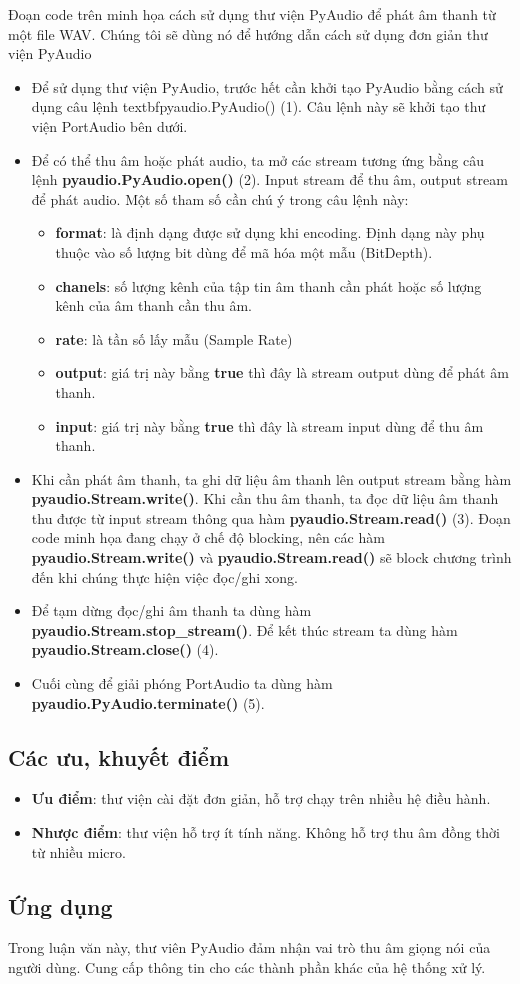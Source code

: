 Đoạn code trên minh họa cách sử dụng thư viện PyAudio để phát âm thanh từ một file WAV. Chúng tôi sẽ dùng nó để hướng dẫn cách sử dụng đơn giản thư viện PyAudio
\begin{itemize}
	\item Để sử dụng thư viện PyAudio, trước hết cần khởi tạo PyAudio bằng cách sử dụng câu lệnh textbf{pyaudio.PyAudio()} (1). Câu  lệnh này sẽ khởi tạo thư viện PortAudio bên dưới.
	\item Để có thể thu âm hoặc phát audio, ta mở các stream tương ứng bằng câu lệnh \textbf{pyaudio.PyAudio.open()} (2). Input stream để thu âm, output stream để phát audio. Một số tham số cần chú ý trong câu lệnh này:
	\begin{itemize}
		\item \textbf{format}: là định dạng được sử dụng khi encoding. Định dạng này phụ thuộc vào số lượng bit dùng để mã hóa một mẫu (BitDepth).
		\item \textbf{chanels}: số lượng kênh của tập tin âm thanh cần phát hoặc số lượng kênh của âm thanh cần thu âm.
		\item \textbf{rate}: là tần số lấy mẫu (Sample Rate)
		\item \textbf{output}: giá trị này bằng \textbf{true} thì đây là stream output dùng để phát âm thanh.
		\item \textbf{input}: giá trị này bằng \textbf{true} thì đây là stream input dùng để thu âm thanh.
	\end{itemize}
	\item Khi cần phát âm thanh, ta ghi dữ liệu âm thanh lên output stream bằng hàm \textbf{pyaudio.Stream.write()}. Khi cần thu âm thanh, ta đọc dữ liệu âm thanh thu được từ input stream thông qua hàm \textbf{pyaudio.Stream.read()} (3). Đoạn code minh họa đang chạy ở chế độ blocking, nên các hàm \textbf{pyaudio.Stream.write()} và \textbf{pyaudio.Stream.read()} sẽ block chương trình đến khi chúng thực hiện việc đọc/ghi xong.
	\item Để tạm dừng đọc/ghi âm thanh ta dùng hàm \textbf{pyaudio.Stream.stop\_stream()}. Để kết thúc stream ta dùng hàm \textbf{pyaudio.Stream.close()} (4).
	\item Cuối cùng để giải phóng PortAudio ta dùng hàm \textbf{pyaudio.PyAudio.terminate()} (5).
\end{itemize}

\subsection{Các ưu, khuyết điểm}
\begin{itemize}
	\item \textbf{Ưu điểm}: thư viện cài đặt đơn giản, hỗ trợ chạy trên nhiều hệ điều hành.
	\item \textbf{Nhược điểm}: thư viện hỗ trợ ít tính năng. Không hỗ trợ thu âm đồng thời từ nhiều micro.
\end{itemize}

\subsection{Ứng dụng}
Trong luận văn này, thư viên PyAudio đảm nhận vai trò thu âm giọng nói của người dùng. Cung cấp thông tin cho các thành phần khác của hệ thống xử lý.





